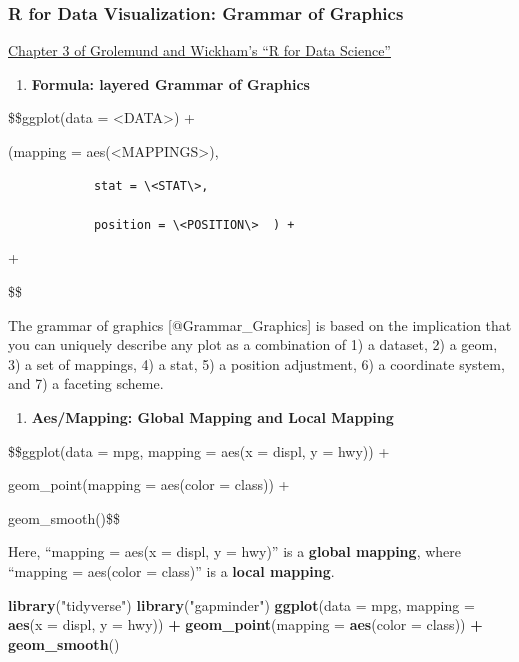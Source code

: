 \documentclass[]{book}
\newenvironment{Shaded}{\begin{snugshade}}{\end{snugshade}}
\newcommand{\KeywordTok}[1]{\textcolor[rgb]{0.13,0.29,0.53}{\textbf{#1}}}
\newcommand{\DataTypeTok}[1]{\textcolor[rgb]{0.13,0.29,0.53}{#1}}
\newcommand{\StringTok}[1]{\textcolor[rgb]{0.31,0.60,0.02}{#1}}
\newcommand{\OperatorTok}[1]{\textcolor[rgb]{0.81,0.36,0.00}{\textbf{#1}}}
\newcommand{\NormalTok}[1]{#1}
\providecommand{\tightlist}{%
  \setlength{\itemsep}{0pt}\setlength{\parskip}{0pt}}
\theoremstyle{definition}
\theoremstyle{definition}
\theoremstyle{definition}
\theoremstyle{remark}
\begin{document}
\subsubsection{R for Data Visualization: Grammar of
Graphics}\label{r-for-data-visualization-grammar-of-graphics}

\href{http://r4ds.had.co.nz/data-visualisation.html}{Chapter 3 of
Grolemund and Wickham's ``R for Data Science''}

\begin{enumerate}
\def\labelenumi{\arabic{enumi}.}
\tightlist
\item
  \textbf{Formula: layered Grammar of Graphics}
\end{enumerate}

\$\$ggplot(data = \textless{}DATA\textgreater{}) +

 (mapping = aes(\textless{}MAPPINGS\textgreater{}),

\begin{verbatim}
            stat = \<STAT\>,   
            
            position = \<POSITION\>  ) + 
\end{verbatim}

 +

\$\$

The grammar of graphics {[}@Grammar\_Graphics{]} is based on the
implication that you can uniquely describe any plot as a combination of
1) a dataset, 2) a geom, 3) a set of mappings, 4) a stat, 5) a position
adjustment, 6) a coordinate system, and 7) a faceting scheme.

\begin{enumerate}
\def\labelenumi{\arabic{enumi}.}
\setcounter{enumi}{1}
\tightlist
\item
  \textbf{Aes/Mapping: Global Mapping and Local Mapping}
\end{enumerate}

\$\$ggplot(data = mpg, mapping = aes(x = displ, y = hwy)) +

geom\_point(mapping = aes(color = class)) +

geom\_smooth()\$\$

Here, ``mapping = aes(x = displ, y = hwy)'' is a \textbf{global
mapping}, where ``mapping = aes(color = class)'' is a \textbf{local
mapping}.

\begin{Shaded}
\begin{Highlighting}[]
\KeywordTok{library}\NormalTok{(}\StringTok{"tidyverse"}\NormalTok{)}
\KeywordTok{library}\NormalTok{(}\StringTok{"gapminder"}\NormalTok{)}
\KeywordTok{ggplot}\NormalTok{(}\DataTypeTok{data =}\NormalTok{ mpg, }\DataTypeTok{mapping =} \KeywordTok{aes}\NormalTok{(}\DataTypeTok{x =}\NormalTok{ displ, }\DataTypeTok{y =}\NormalTok{ hwy)) }\OperatorTok{+}\StringTok{  }\KeywordTok{geom_point}\NormalTok{(}\DataTypeTok{mapping =} \KeywordTok{aes}\NormalTok{(}\DataTypeTok{color =}\NormalTok{ class)) }\OperatorTok{+}\StringTok{  }\KeywordTok{geom_smooth}\NormalTok{()}
\end{Highlighting}
\end{Shaded}
\end{document}
